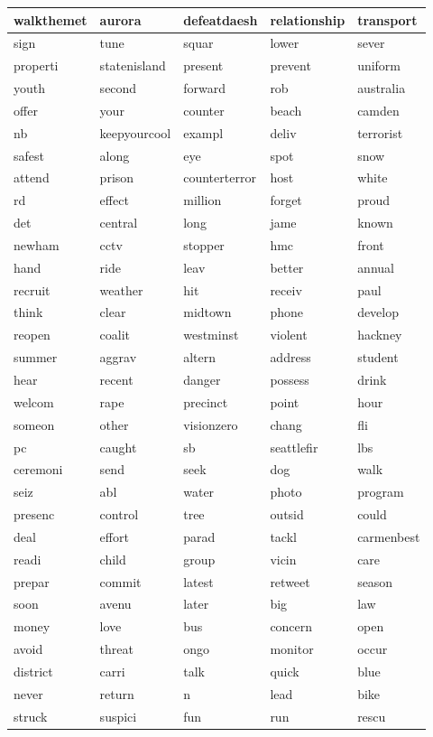 \begin{longtable}{p{2.5cm}p{2.5cm}p{2.5cm}p{2.5cm}p{2.5cm}}
walkthemet&aurora&defeatdaesh&relationship&transport\\ \hline 
sign&tune&squar&lower&sever\\ \hline 
properti&statenisland&present&prevent&uniform\\ \hline 
youth&second&forward&rob&australia\\ \hline 
offer&your&counter&beach&camden\\ \hline 
nb&keepyourcool&exampl&deliv&terrorist\\ \hline 
safest&along&eye&spot&snow\\ \hline 
attend&prison&counterterror&host&white\\ \hline 
rd&effect&million&forget&proud\\ \hline 
det&central&long&jame&known\\ \hline 
newham&cctv&stopper&hmc&front\\ \hline 
hand&ride&leav&better&annual\\ \hline 
recruit&weather&hit&receiv&paul\\ \hline 
think&clear&midtown&phone&develop\\ \hline 
reopen&coalit&westminst&violent&hackney\\ \hline 
summer&aggrav&altern&address&student\\ \hline 
hear&recent&danger&possess&drink\\ \hline 
welcom&rape&precinct&point&hour\\ \hline 
someon&other&visionzero&chang&fli\\ \hline 
pc&caught&sb&seattlefir&lbs\\ \hline 
ceremoni&send&seek&dog&walk\\ \hline 
seiz&abl&water&photo&program\\ \hline 
presenc&control&tree&outsid&could\\ \hline 
deal&effort&parad&tackl&carmenbest\\ \hline 
readi&child&group&vicin&care\\ \hline 
prepar&commit&latest&retweet&season\\ \hline 
soon&avenu&later&big&law\\ \hline 
money&love&bus&concern&open\\ \hline 
avoid&threat&ongo&monitor&occur\\ \hline 
district&carri&talk&quick&blue\\ \hline 
never&return&n&lead&bike\\ \hline 
struck&suspici&fun&run&rescu\\ \hline 

\end{longtable}
